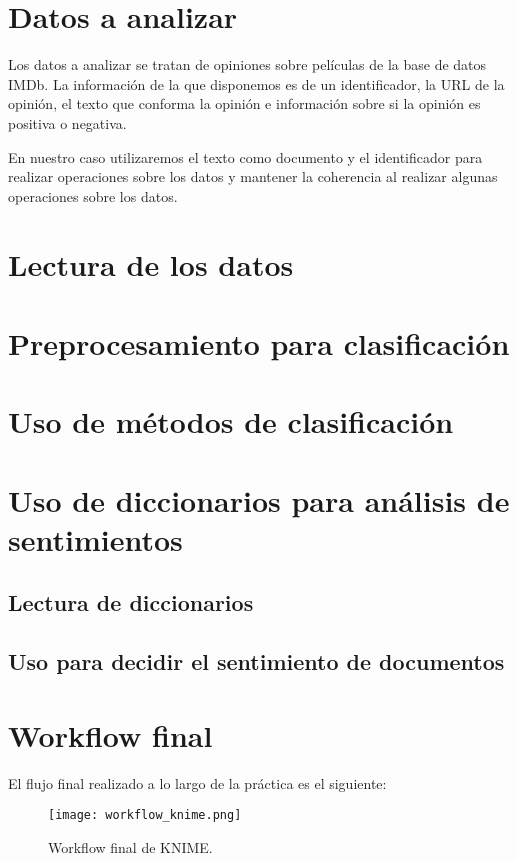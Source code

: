 \section{Datos a analizar}

Los datos a analizar se tratan de opiniones sobre películas de la base de datos IMDb. La información de la que disponemos es de un identificador, la URL de la opinión, el texto que conforma la opinión e información sobre si la opinión es positiva o negativa.

En nuestro caso utilizaremos el texto como documento y el identificador para realizar operaciones sobre los datos y mantener la coherencia al realizar algunas operaciones sobre los datos.

\section{Lectura de los datos}



\section{Preprocesamiento para clasificación}



\section{Uso de métodos de clasificación}



\section{Uso de diccionarios para análisis de sentimientos}

\subsection{Lectura de diccionarios}

\subsection{Uso para decidir el sentimiento de documentos}


\section{Workflow final}


El flujo final realizado a lo largo de la práctica es el siguiente:

\begin{figure}[H]
	\centering
	\texttt{[image: workflow\_knime.png]}
	\caption{Workflow final de KNIME.}
	\label{fig:workflow_knime}
\end{figure}
